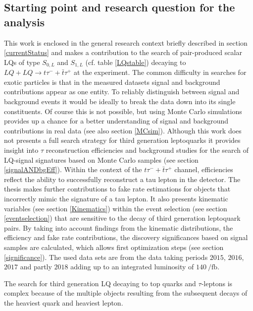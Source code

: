 \subsection{Starting point and research question for the analysis}\label{startingpoint}
This work is enclosed in the general research context briefly described in section \ref{currentStatus} and makes a contribution to the search of pair-produced scalar LQs of type $S_{0,L}$ and $S_{1,L}$ (cf. table \ref{LQstable}) decaying to $LQ+LQ\rightarrow t\tau^{-}+\bar{t}\tau^{+}$ at the {\ATLAS} experiment. The common difficulty in searches for exotic particles is that in the measured datasets signal and background contributions appear as one entity. To reliably distinguish between signal and background events it would be ideally to break the data down into its single constituents. Of course this is not possible, but using Monte Carlo simulations provides up a chance for a better understanding of signal and background contributions in real data (see also section \ref{MCsim}). Although this work does not presents a full search strategy for third generation leptoquarks it provides insight into $\tau$ reconstruction efficiencies and background studies for the search of LQ-signal signatures based on Monte Carlo samples (see section \ref{signalANDbgEff}). Within the context of the $t\tau^{-}+\bar{t}\tau^{+}$ channel, efficiencies reflect the ability to successfully reconstruct a tau lepton in the detector. The thesis makes further contributions to fake rate estimations for objects that incorrectly mimic the signature of a tau lepton. It also presents kinematic variables (see section \ref{Kinematics}) within the event selection (see section \ref{eventselection}) that are sensitive to the decay of third generation leptoquark pairs. By taking into account findings from the kinematic distributions, the efficiency and fake rate contributions, the discovery significances based on signal samples are calculated, which allows first optimization steps (see section \ref{significance}). The used data sets are from the data taking periods $2015$, $2016$, $2017$ and partly $2018$ adding up to an integrated luminosity of $\SI{140}{\per\femto\barn}$.\par   
The search for third generation LQ decaying to top quarks and $\tau$-leptons is complex because of the multiple objects resulting from the subsequent decays of the heaviest quark and heaviest lepton. 
%
%
